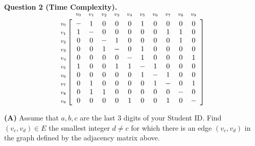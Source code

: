\documentclass[a4paper,12pt]{article}
\newcommand{\indsize}{\scriptsize}
\newcommand{\colind}[2]{\displaystyle\smash{\mathop{#1}^{\raisebox{.5\normalbaselineskip}{\indsize #2}}}}
\newcommand{\rowind}[1]{\mbox{\indsize #1}}
\begin{document}
\newpage




\vspace{20pt}
{\bf Question 2 (Time Complexity).} 


\vspace{10pt}
$$\begin{array}{@{}c@{}}
\rowind{$v_0$} \\ 
\rowind{$v_1$} \\ 
\rowind{$v_2$} \\ 
\rowind{$v_3$} \\ 
\rowind{$v_4$} \\ 
\rowind{$v_5$} \\ 
\rowind{$v_6$} \\ 
\rowind{$v_7$} \\
\rowind{$v_8$} \\ 
\rowind{$v_9$} \\
\end{array}
\mathop{\left[
\begin{array}{ *{10}{c} }
\colind{-}{$v_0$} & \colind{1}{$v_1$} & \colind{0}{$v_2$} & \colind{0}{$v_3$} & \colind{0}{$v_4$} & \colind{1}{$v_5$} & \colind{0}{$v_6$} & \colind{0}{$v_7$} & \colind{0}{$v_8$} & \colind{0}{$v_9$} \\
1 & - & 0 & 0 & 0 & 0 & 0 & 1 & 1 & 0\\
0 & 0 & - & 1 & 0 & 0 & 0 & 0 & 1 & 0 \\
0 & 0 & 1 & - & 0 & 1 & 0 & 0 & 0 & 0 \\
0 & 0 & 0 & 0 & - & 1 & 0 & 0 & 0 & 1 \\
1 & 0 & 0 & 1 & 1 & - & 1 & 0 & 0 & 0 \\
0 & 0 & 0 & 0 & 0 & 1 & - & 1 & 0 & 0 \\
0 & 1 & 0 & 0 & 0 & 0 & 1 & - & 0 & 1 \\
0 & 1 & 1 & 0 & 0 & 0 & 0 & 0 & - & 0 \\
0 & 0 & 0 & 0 & 1 & 0 & 0 & 1 & 0 & - \\
\end{array}
\right]}$$





\vspace{5pt}
{\bf (A)} Assume that $a,b,c$ are the last $3$ digits of your Student ID. 
Find $(v_c,v_d) \in E$ \textendash{} the smallest integer $d \neq c$ for which 
there is an edge $(v_c,v_d)$ in the graph defined by the adjacency matrix above.
\end{document}
